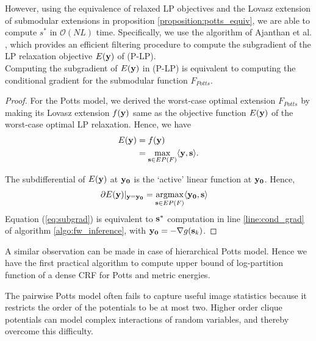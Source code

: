 However, using the equivalence of relaxed LP objectives and the Lovasz
extension of submodular extensions in proposition
\ref{proposition:potts_equiv}, we are able to compute $s^*$ in ${\mathcal
O}(NL)$ time. Specifically, we use the algorithm of
Ajanthan et al. \citep{ajanthan2017efficient}, which provides an efficient filtering procedure to compute the subgradient of the LP relaxation objective $E({\bf y})$ of (P-LP).\\
%
\vspace{-0.5cm}
{\proposition Computing the subgradient of $E({\bf y})$ in (P-LP) is equivalent to computing the conditional gradient for the submodular function $F_{Potts}$. \label{proposition:subgrad}} 
\begin{proof}
  For the Potts model, we derived the worst-case optimal extension $F_{Potts}$ by
  making its Lovasz extension $f({\bf y})$ same as the objective function
    $E({\bf y})$ of the worst-case optimal LP relaxation. Hence, we have
\begin{align}
    E({\bf y}) &= f({\bf y})  \nonumber \\
    {} &=  \max_{{\bf s} \in EP(F)} \langle {\bf y}, {\bf s} \rangle.\nonumber
\end{align}

The subdifferential of $E({\bf y})$ at $\bf y_0$ is the `active' linear function at $\bf y_0$. Hence,
\begin{align}
    \partial E({\bf y})|_{\bf y = y_0} &=  \argmax_{{\bf s} \in EP(F)} \langle {\bf y_0}, {\bf s} \rangle
    \label{eq:subgrad}
\end{align}
Equation (\ref{eq:subgrad}) is equivalent to ${\bf s}^*$ computation in line \ref{line:cond_grad} of algorithm \ref{algo:fw_inference}, with ${\bf y_0} = - \nabla g({\bf s}_k)$.
\end{proof}

A similar observation can be made in case of hierarchical Potts model. Hence we have the first practical algorithm to compute upper bound of log-partition function of a dense CRF for Potts and metric energies.

 The pairwise Potts model often fails
to capture useful image statistics because it restricts the order of the
potentials to be at most two. Higher order clique potentials can model complex
interactions of random variables, and thereby overcome this difficulty.

